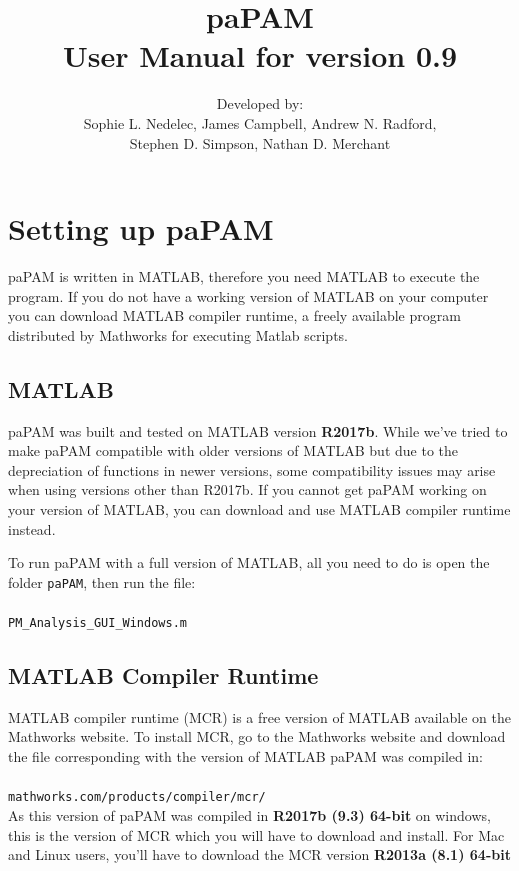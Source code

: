 \documentclass[11pt]{report}
\title{paPAM \\ \Large User Manual for version 0.9}
\author{Developed by:\\ Sophie L. Nedelec, James Campbell, Andrew N. Radford,\\Stephen D. Simpson, Nathan D. Merchant}
\begin{document}
\maketitle

\tableofcontents

\chapter{Setting up paPAM} \label{SettingUppaPAM}

paPAM is written in MATLAB, therefore you need MATLAB to execute the program.  If you do not have a working version of MATLAB on your computer you can download MATLAB compiler runtime, a freely available program distributed by Mathworks for executing Matlab scripts.

\section{MATLAB}
paPAM was built and tested on MATLAB version \textbf{R2017b}.
While we've tried to make paPAM compatible with older versions of MATLAB but due to the depreciation of functions in newer versions, some compatibility issues may arise when using versions other than R2017b.
If you cannot get paPAM working on your version of MATLAB, you can download and use MATLAB compiler runtime instead.

To run paPAM with a full version of MATLAB, all you need to do is open the folder \texttt{paPAM}, then run the file:\\\\ \texttt{PM\_Analysis\_GUI\_Windows.m}

\section{MATLAB Compiler Runtime}

MATLAB compiler runtime (MCR) is a free version of MATLAB available on the Mathworks website.  To install MCR, go to the Mathworks website and download the file corresponding with the version of MATLAB paPAM was compiled in:\\\\
\texttt{mathworks.com/products/compiler/mcr/}\\

As this version of paPAM was compiled in \textbf{R2017b (9.3) 64-bit} on windows, this is the version of MCR which you will have to download and install.
For Mac and Linux users, you'll have to download the MCR version \textbf{R2013a (8.1) 64-bit}
\end{document}
